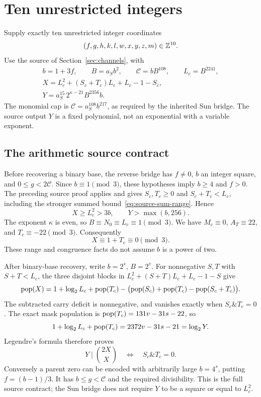 \section{Ten unrestricted integers}
\label{sec:ten}

Supply exactly ten unrestricted integer coordinates
\[
 (f,g,h,k,l,w,x,y,z,m)\in\mathbb Z^{10}.
\]
Use the source of Section~\ref{sec:channels}, with
\begin{gather*}
 b=1+3f,\qquad B=a_Sb^2,\qquad \mathcal C=bB^{108},\qquad L_c=B^{2241},\\
 X=L_c^2+(S_c+T_c)L_c+L_c-1-S_c,\\
 Y=a_S^{15}\,2^{\kappa-21}B^{2356}b.
\end{gather*}
The monomial cap is \(\mathcal C=a_S^{108}b^{217}\), as required
by the inherited Sun bridge.  The source output \(Y\) is a fixed
polynomial, not an exponential with a variable exponent.

\subsection{The arithmetic source contract}

Before recovering a binary base, the reverse bridge has \(f\ne0\),
\(b\) an integer square, and \(0\le g<2\mathcal C\).  Since
\(b\equiv1\pmod3\), these hypotheses imply \(b\ge4\) and \(f>0\).
The preceding source proof applies and gives
\(S_c,T_c\ge0\) and \(S_c+T_c<L_c\), including the stronger summed
bound~\eqref{eq:source-sum-range}.  Hence
\[
 X\ge L_c^2>3b,\qquad Y>\max(b,256).
\]
The exponent \(\kappa\) is even, so \(B\equiv N_0\equiv L_c\equiv1\pmod3\).
We have \(M_c\equiv0\), \(A_T\equiv22\), and
\(T_c\equiv-22\pmod3\).  Consequently
\[
 X\equiv1+T_c\equiv0\pmod3.
\]
These range and congruence facts do not assume \(b\) is a power of two.

After binary-base recovery, write \(b=2^s\), \(B=2^v\).  For
nonnegative \(S,T\) with \(S+T<L_c\), the three disjoint blocks in
\(L_c^2+(S+T)L_c+L_c-1-S\) give
\[
 \operatorname{pop}(X)=1+\log_2L_c+\operatorname{pop}(T_c)
       -\bigl(\operatorname{pop}(S_c)+\operatorname{pop}(T_c)-\operatorname{pop}(S_c+T_c)\bigr).
\]
The subtracted carry deficit is nonnegative, and vanishes exactly when
\(S_c\mathbin{\&}T_c=0\).  The exact mask population is
\(\operatorname{pop}(T_c)=131v-31s-22\), so
\[
 1+\log_2L_c+\operatorname{pop}(T_c)=2372v-31s-21=\log_2Y.
\]
Legendre's formula therefore proves
\[
 Y\mid\binom{2X}{X}\quad\Longleftrightarrow\quad
 S_c\mathbin{\&}T_c=0.
\]
Conversely a parent zero can be encoded with arbitrarily large
\(b=4^s\), putting \(f=(b-1)/3\).  It has \(b\le g<\mathcal C\)
and the required divisibility.  This is the full source contract; the
Sun bridge does not require \(Y\) to be a square or equal to \(L_c^2\).

